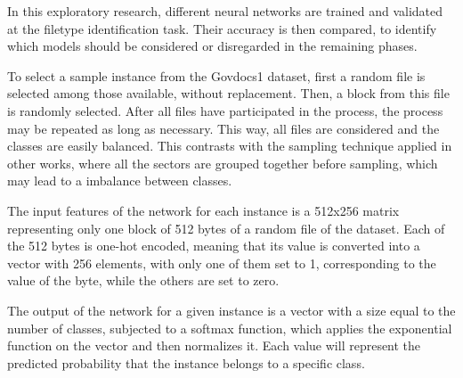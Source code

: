 \label{sec:evalmodels}

In this exploratory research, different neural networks are trained and validated
at the filetype identification task. Their accuracy is then compared,
to identify which models should be considered or disregarded in the remaining phases.


To select a sample instance from the Govdocs1 dataset, first a random file is selected among those available, without replacement. Then, a block from this file is randomly selected. After all files have participated in the process, the process may be repeated as long as necessary. This way, all files are considered and the classes are easily balanced.
This contrasts with the sampling technique applied in other works, where all the sectors are grouped together before sampling, which may lead to a imbalance between classes.

The input features of the network for each instance is a 512x256 matrix representing only one block of 512 bytes of a random file of the dataset. Each of the 512 bytes is one-hot encoded, meaning that its value is converted into a vector with 256 elements, with only one of them set to 1, corresponding to the value of the byte, while the others are set to zero.


The output of the network for a given instance is a vector with a size equal to the number of classes, subjected to a softmax function, which applies the exponential function on the vector and then normalizes it. Each value will represent the predicted probability that the instance belongs to a specific class.


